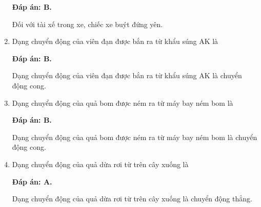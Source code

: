 \begin{enumerate}[label=\bfseries Câu \arabic*:]
	\hideall
	{\textbf{Đáp án: B.}
		
		Đối với tài xế trong xe, chiếc xe buýt đứng yên.
		
	}
	\item {}
	
	
	{Dạng chuyển động của viên đạn được bắn ra từ khẩu súng AK là
	}
	
	\hideall
	{\textbf{Đáp án: B.}
		
		Dạng chuyển động của viên đạn được bắn ra từ khẩu súng AK là chuyển động cong.
		
		
	}
	\item {}
	
	
	{
		Dạng chuyển động của quả bom được ném ra từ máy bay ném bom là
	}
	
	\hideall
	{\textbf{Đáp án: B.}
		
		Dạng chuyển động của quả bom được ném ra từ máy bay ném bom là chuyển động cong. 
		
	}
	
	\item {}
	
	
	{Dạng chuyển động của quả dừa rơi từ trên cây xuống là
		
	}
	
	\hideall
	{\textbf{Đáp án: A.}
		
		Dạng chuyển động của quả dừa rơi từ trên cây xuống là chuyển động thẳng.		
		
}
\end{enumerate}
